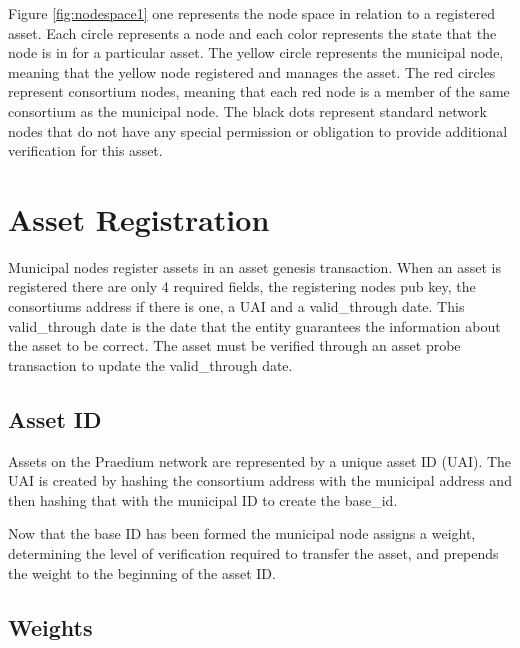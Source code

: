 \documentclass[12pt]{article}
\begin{document}
Figure \ref{fig:nodespace1} one represents the node space in relation to a registered asset.
Each circle represents a node and each color represents the state that the
node is in for a particular asset.  The yellow circle represents the municipal node, meaning
that the yellow node registered and manages the asset.  The red circles represent consortium 
nodes, meaning that each red node is a member of the same consortium as the municipal node.
The black dots represent standard network nodes that do not have any special permission or
obligation to provide additional verification for this asset.  






\section{Asset Registration}

Municipal nodes register assets in an asset genesis transaction.  When 
an asset is registered there are only 4 required fields, the registering nodes 
pub key, the consortiums address if there is one, a UAI and a valid\_through date.  
This valid\_through date is the date that the entity guarantees the information 
about the asset to be correct.  The asset must be verified through an asset probe 
transaction to update the valid\_through date.

\subsection{Asset ID}

Assets on the Praedium network are represented by a unique asset ID (UAI).  
The UAI is created by hashing the consortium address with the municipal address 
and then hashing that with the municipal ID to create the base\_id.





Now that the base ID has been formed the municipal node assigns 
a weight, determining the level of verification required to transfer 
the asset, and prepends the weight to the beginning of the asset ID.

\subsection{Weights}
\end{document}

